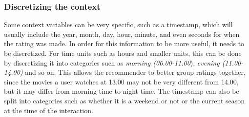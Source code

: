 \subsubsection*{Discretizing the context}
Some context variables can be very specific, such as a timestamp, which will usually include the year, month, day, hour, minute, and even seconds for when the rating was made.
In order for this information to be more useful, it needs to be discretized.
For time units such as hours and smaller units, this can be done by discretizing it into categories such as \textit{morning (06.00-11.00}), \textit{evening (11.00-14.00)} and so on.
This allows the recommender to better group ratings together, since the movies a user watches at 13.00 may not be very different from 14.00, but it may differ from morning time to night time.
The timestamp can also be split into categories such as whether it is a weekend or not or the current season at the time of the interaction.

